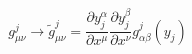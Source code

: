 \begin{equation}
g^j_{\mu \nu} \rightarrow \tilde{g}_{\mu \nu}^j = \frac{\partial
y_j^{\alpha}}{\partial x^{\mu}} \frac{\partial y_j^{\beta}}{\partial x^{\nu}}
 g^j_{\alpha \beta} ( y_j )
\end{equation} 
